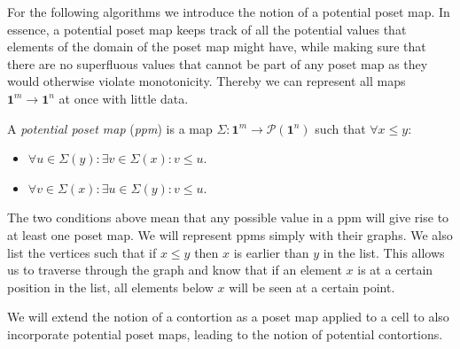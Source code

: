 \documentclass{llncs}
\newcommand{\mname}[1]{\textit{{#1}}}
\newcommand{\pint}[1]{\mathbf{1}^{#1}}
\newcommand{\pow}[1]{\mathcal{P}({#1})}
\begin{document}
For the following algorithms we introduce the notion of a potential poset map. In
essence, a potential poset map keeps track of all the potential values that elements of
the domain of the poset map might have, while making sure that there are no
superfluous values that cannot be part of any poset map as they would otherwise
violate monotonicity. Thereby we can represent all maps $\pint{m} \to \pint{n}$
at once with little data.

\begin{definition}

  A \mname{potential poset map} (\mname{ppm}) is a map $\Sigma : \pint{m} \to \pow{\pint{n}}$
  such that $\forall x \leq y$:
  \begin{itemize}
  \item $\forall u \in \Sigma(y) : \exists v \in \Sigma(x) : v \leq u$.
  \item $\forall v \in \Sigma(x) : \exists u \in \Sigma(y) : v \leq u$.
  \end{itemize}

\end{definition}

The two conditions above mean that any possible value in a ppm will give
rise to at least one poset map.
We will represent ppms simply with their graphs. We also
list the vertices such that if $x \leq y$ then $x$ is earlier than $y$ in the
list. This allows us to traverse through the graph and know that if an element
$x$ is at a certain position in the list, all elements below $x$ will be seen at
a certain point.

We will extend the notion of a contortion as a poset map applied to a cell to
also incorporate potential poset maps, leading to the notion of potential contortions.
\end{document}
